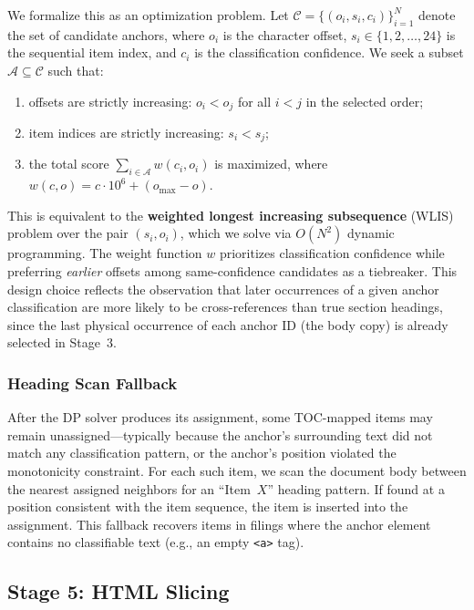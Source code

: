 \documentclass[12pt,letterpaper,oneside]{article}
\begin{document}
We formalize this as an optimization problem. Let
$\mathcal{C} = \{(o_i, s_i, c_i)\}_{i=1}^{N}$ denote the set of
candidate anchors, where $o_i$ is the character offset, $s_i \in
\{1, 2, \ldots, 24\}$ is the sequential item index, and $c_i$ is
the classification confidence. We seek a subset
$\mathcal{A} \subseteq \mathcal{C}$ such that:
\begin{enumerate}
  \item offsets are strictly increasing: $o_i < o_j$ for all
        $i < j$ in the selected order;
  \item item indices are strictly increasing: $s_i < s_j$;
  \item the total score $\sum_{i \in \mathcal{A}} w(c_i, o_i)$ is
        maximized, where $w(c, o) = c \cdot 10^6 + (o_{\max} - o)$.
\end{enumerate}

This is equivalent to the \textbf{weighted longest increasing
subsequence} (WLIS) problem over the pair $(s_i, o_i)$, which we
solve via $O(N^2)$ dynamic programming. The weight function $w$
prioritizes classification confidence while preferring \emph{earlier}
offsets among same-confidence candidates as a tiebreaker. This
design choice reflects the observation that later occurrences of a
given anchor classification are more likely to be cross-references
than true section headings, since the last physical occurrence of
each anchor ID (the body copy) is already selected in Stage~3.

\subsubsection{Heading Scan Fallback}

After the DP solver produces its assignment, some TOC-mapped items
may remain unassigned---typically because the anchor's surrounding
text did not match any classification pattern, or the anchor's
position violated the monotonicity constraint. For each such item,
we scan the document body between the nearest assigned neighbors for
an ``Item~$X$'' heading pattern. If found at a position consistent
with the item sequence, the item is inserted into the assignment.
This fallback recovers items in filings where the anchor element
contains no classifiable text (e.g., an empty \texttt{<a>} tag).

\subsection{Stage 5: HTML Slicing}
\end{document}
